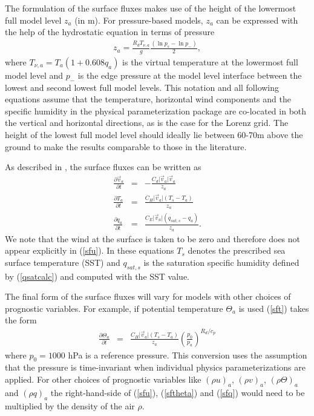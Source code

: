 \documentclass[times,doublespace]{fldauth}
\begin{document}
{\begin{appendix}
The formulation of the surface fluxes makes use of the height of the lowermost full model level $z_a$ (in m).  For pressure-based models, $z_a$ can be expressed with the help of the hydrostatic equation in terms of pressure
\begin{eqnarray} \label{eqn:za}
z_a = \frac{R_d T_{\nu,a}}{g} \frac{(\ln p_s- \ln p_-)}{2},
\end{eqnarray}
where $T_{\nu,a} = T_a (1+0.608 q_a)$ is the virtual temperature at the lowermost full model level and $p_-$ is the edge pressure at the model level interface between the lowest and second lowest full model levels. This notation and all following equations assume that the temperature, horizontal wind components and the specific humidity in the physical parameterization package are co-located in both the vertical and horizontal directions, as is the case for the Lorenz grid. The height of the lowest full model level should ideally lie between 60-70m above the ground to make the results comparable to those in the literature.

As described in \cite{reed2012idealized}, the surface fluxes can be written as
\begin{eqnarray}
\frac{\partial \vec{v}_a}{\partial t} &=& - \frac{C_d \vert \vec{v}_a \vert \vec{v}_a}{z_a} \label{sfu} \\
\frac{\partial T_a}{\partial t} &=& \frac{C_H \vert \vec{v}_a \vert (T_s-T_a)}{z_a} \label{sft} \\
\frac{\partial q_a}{\partial t} &=& \frac{C_E \vert \vec{v}_a \vert(q_{sat,s}-q_a)}{z_a}. \label{sfq}
\end{eqnarray}
We note that the wind at the surface is taken to be zero and therefore does not appear explicitly in (\ref{sfu}).  In these equations $T_s$  denotes the prescribed sea surface temperature (SST) and $q_{sat,s}$ is the saturation specific humidity defined by (\ref{qsatcalc}) and computed with the SST value.

The final form of the surface fluxes will vary for models with other choices of prognostic variables. For example, if potential temperature $\Theta_a$ is used (\ref{sft}) takes the form
\begin{eqnarray}
\frac{\partial \Theta_a}{\partial t} &=& \frac{C_H \vert \vec{v}_a \vert (T_s-T_a)}{z_a} \left (\frac{p_0}{p_a} \right )^{R_d/c_p} \label{sftheta}
\end{eqnarray}
where $p_0 = 1000$ hPa is a reference pressure. This conversion uses the assumption that the pressure is time-invariant when individual physics parameterizations are applied. For other choices of prognostic variables like $(\rho u)_a$, $(\rho v)_a$, $(\rho \Theta)_a$ and $(\rho q)_a$ the right-hand-side of (\ref{sfu}), (\ref{sftheta}) and (\ref{sfq}) would need to be multiplied by the density of the air $\rho$.


\end{appendix}}
\end{document}
